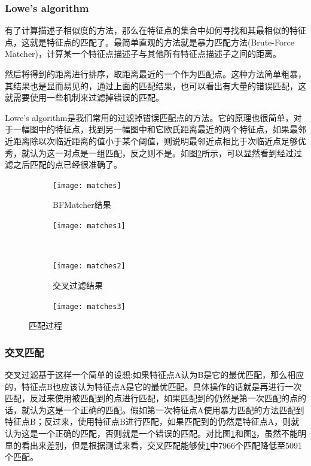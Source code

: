 \subsubsection{Lowe’s algorithm}
有了计算描述子相似度的方法，那么在特征点的集合中如何寻找和其最相似的特征点，这就是特征点的匹配了。最简单直观的方法就是暴力匹配方法(Brute-Force Matcher)，计算某一个特征点描述子与其他所有特征点描述子之间的距离。\par
然后将得到的距离进行排序，取距离最近的一个作为匹配点。这种方法简单粗暴，其结果也是显而易见的，通过上面的匹配结果，也可以看出有大量的错误匹配，这就需要使用一些机制来过滤掉错误的匹配。\par
Lowe's algorithm\cite{muja2009fast}是我们常用的过滤掉错误匹配点的方法。它的原理也很简单，对于一幅图中的特征点，找到另一幅图中和它欧氏距离最近的两个特征点，如果最邻近距离除以次临近距离的值小于某个阈值，则说明最邻近点相比于次临近点足够优秀，就认为这一对点是一组匹配，反之则不是。如图\ref{lowe's filter}所示，可以显然看到经过过滤之后匹配的点已经很准确了。
\begin{figure}[H]
	\centering
	\begin{subfigure}[ht]{0.4\textwidth}
		\centering
		\texttt{[image: matches]}
		\caption{BFMatcher结果}
		\label{no filter}
	\end{subfigure}
	\quad
	\begin{subfigure}[ht]{0.4\textwidth}
		\centering
		\texttt{[image: matches1]}
		\label{lowe's filter}
	\end{subfigure}\\
	\begin{subfigure}[ht]{0.4\textwidth}
		\centering
		\texttt{[image: matches2]}
		\caption{交叉过滤结果}
		\label{crosscheck filter}
	\end{subfigure}
	\quad
	\begin{subfigure}[ht]{0.4\textwidth}
		\centering
		\texttt{[image: matches3]}
		\label{RANSAC filter}
	\end{subfigure}
	\caption{匹配过程}
\end{figure}
\subsubsection{交叉匹配}
交叉过滤基于这样一个简单的设想:如果特征点A认为B是它的最优匹配，那么相应的，特征点B也应该认为特征点A是它的最优匹配。具体操作的话就是再进行一次匹配，反过来使用被匹配到的点进行匹配，如果匹配到的仍然是第一次匹配的点的话，就认为这是一个正确的匹配。假如第一次特征点A使用暴力匹配的方法匹配到特征点B；反过来，使用特征点B进行匹配，如果匹配到的仍然是特征点A，则就认为这是一个正确的匹配，否则就是一个错误的匹配。对比图\ref{no filter}和图\ref{crosscheck filter}，虽然不能明显的看出来差别，但是根据测试来看，交叉匹配能够使\ref{no filter}中7966个匹配降低至5091个匹配。
